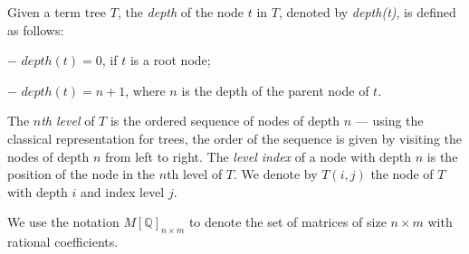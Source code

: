 \begin{definition}\label{def:termtreelevel}
Given  a term tree $T$, the \emph{depth} of the node $t$ in $T$, denoted by \emph{depth(t)}, is defined as follows:

$-$ $depth(t) = 0$, if $t$ is a root node;

$-$ $depth(t) = n+1$, where $n$ is the depth of the parent node of $t$.

The \emph{$n$th level} of $T$ is the ordered sequence of nodes of depth $n$ --- using the classical representation for trees, the order of the sequence is 
given by visiting the nodes of depth $n$ from left to right. The \emph{level index} of a node with depth $n$ is the position of the node in the $n$th level of $T$.
We denote by $T(i,j)$ the node of $T$ with depth $i$ and index level $j$.
\end{definition}
	
	
% 
% 
% 

We use the notation $M[\mathbb{Q}]_{n\times m}$ to denote the set of matrices of size  $n\times m$ with rational coefficients.


